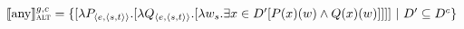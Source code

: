 $\intension[g,c]{any}_\text{\scshape alt}=\{[\lambda{P_{\langle e,\langle s,t\rangle\rangle}}.[\lambda{Q_{\langle e,\langle s,t\rangle\rangle}}.[\lambda{w_s}.\exists{x\in D'}[P(x)(w)\land Q(x)(w)]]]]~|~D'\subseteq D^c\}$